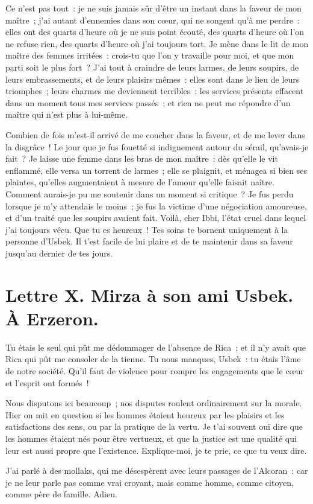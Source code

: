 \documentclass[french,twoside]{book} %
\newcommand{\dateline}[1]{\medskip{\RaggedLeft{#1}\par}\bigskip}
\begin{document}
Ce n’est pas tout : je ne suis jamais sûr d’être un instant dans la faveur de mon maître ; j’ai autant d’ennemies dans son cœur, qui ne songent qu’à me perdre : elles ont des quarts d’heure où je ne suis point écouté, des quarts d’heure où l’on ne refuse rien, des quarts d’heure où j’ai toujours tort. Je mène dans le lit de mon maître des femmes irritées : crois-tu que l’on y travaille pour moi, et que mon parti soit le plus fort ? J’ai tout à craindre de leurs larmes, de leurs soupirs, de leurs embrassements, et de leurs plaisirs mêmes : elles sont dans le lieu de leurs triomphes ; leurs charmes me deviennent terribles : les services présents effacent dans un moment tous mes services passés ; et rien ne peut me répondre d’un maître qui n’est plus à lui-même.\par
Combien de fois m’est-il arrivé de me coucher dans la faveur, et de me lever dans la disgrâce ! Le jour que je fus fouetté si indignement autour du sérail, qu’avais-je fait ? Je laisse une femme dans les bras de mon maître : dès qu’elle le vit enflammé, elle versa un torrent de larmes ; elle se plaignit, et ménagea si bien ses plaintes, qu’elles augmentaient à mesure de l’amour qu’elle faisait naître. Comment aurais-je pu me soutenir dans un moment si critique ? Je fus perdu lorsque je m’y attendais le moins ; je fus la victime d’une négociation amoureuse, et d’un traité que les soupirs avaient fait. Voilà, cher Ibbi, l’état cruel dans lequel j’ai toujours vécu. Que tu es heureux ! Tes soins te bornent uniquement à la personne d’Usbek. Il t’est facile de lui plaire et de te maintenir dans sa faveur jusqu’au dernier de tes jours.\par

\dateline{Du sérail d’Ispahan, le dernier de la lune de Saphar, 1711.}
\section[{Lettre X. Mirza à son ami Usbek. À Erzeron.}]{Lettre X. Mirza à son ami Usbek. À Erzeron.}\renewcommand{\leftmark}{Lettre X. Mirza à son ami Usbek. À Erzeron.}

\noindent Tu étais le seul qui pût me dédommager de l’absence de Rica ; et il n’y avait que Rica qui pût me consoler de la tienne. Tu nous manques, Usbek : tu étais l’âme de notre société. Qu’il faut de violence pour rompre les engagements que le cœur et l’esprit ont formés !\par
Nous disputons ici beaucoup ; nos disputes roulent ordinairement sur la morale. Hier on mit en question si les hommes étaient heureux par les plaisirs et les satisfactions des sens, ou par la pratique de la vertu. Je t’ai souvent ouï dire que les hommes étaient nés pour être vertueux, et que la justice est une qualité qui leur est aussi propre que l’existence. Explique-moi, je te prie, ce que tu veux dire.\par
J’ai parlé à des mollaks, qui me désespèrent avec leurs passages de l’Alcoran : car je ne leur parle pas comme vrai croyant, mais comme homme, comme citoyen, comme père de famille. Adieu.\par
\end{document}
